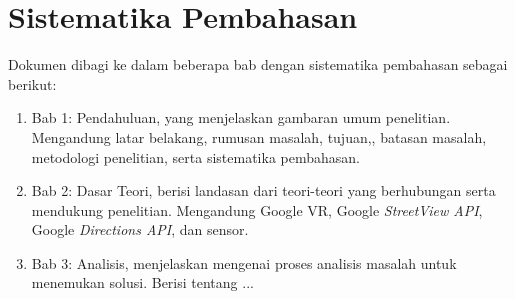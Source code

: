 \section{Sistematika Pembahasan}
\label{sec:sispem}
Dokumen dibagi ke dalam beberapa bab dengan sistematika pembahasan sebagai berikut:
\begin{enumerate}
	\item Bab 1: Pendahuluan, yang menjelaskan gambaran umum penelitian. Mengandung latar belakang, rumusan masalah, tujuan,, batasan masalah, metodologi penelitian, serta sistematika pembahasan.
	\item Bab 2: Dasar Teori, berisi landasan dari teori-teori yang berhubungan serta mendukung penelitian. Mengandung Google VR, Google {\it StreetView API}, Google {\it Directions API}, dan sensor.
	\item Bab 3: Analisis, menjelaskan mengenai proses analisis masalah untuk menemukan solusi. Berisi tentang ...
\end{enumerate}
